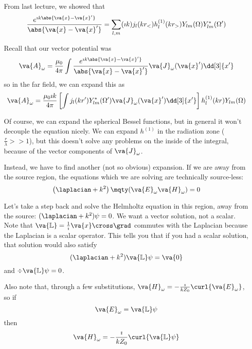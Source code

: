 \documentclass[a4paper,twoside,master.tex]{subfiles}
\begin{document}

From last lecture, we showed that
\begin{equation}
    \frac{e^{\imath k \abs{ \va{x} - \va{x}'}}}{\abs{ \va{x} - \va{x}'}} = \sum_{l,m} (\imath k) j_l(k r_<) h_l^{(1)}(k r_>) Y_{lm}(\Omega) Y_{lm}^*(\Omega')
\end{equation}

Recall that our vector potential was
\begin{equation}
    \va{A}_{\omega} = \frac{\mu_0}{4 \pi} \int \frac{e^{\imath k \abs{ \va{x} - \va{x}'}}}{\abs{ \va{x} - \va{x}'}} \va{J}_{\omega}( \va{x}') \dd[3]{x'}
\end{equation}
so in the far field, we can expand this as
\begin{equation}
    \va{A}_{\omega} = \frac{\mu_0 \imath k}{4 \pi} \left[ \int j_l(kr') Y_{lm}^*(\Omega') \va{J}_{\omega}( \va{x}') \dd[3]{x'} \right] h_l^{(1)}(kr) Y_{lm}(\Omega)
\end{equation}

Of course, we can expand the spherical Bessel functions, but in general it won't decouple the equation nicely. We can expand $ h^{(1)} $ in the radiation zone ($ \frac{r}{\lambda} >> 1 $), but this doesn't solve any problems on the inside of the integral, because of the vector components of $ \va{J}_{\omega} $.

Instead, we have to find another (not so obvious) expansion. If we are away from the source region, the equations which we are solving are technically source-less:
\begin{equation}
    \left( \laplacian + k^2 \right) \mqty( \va{E}_{\omega} \\ \va{H}_{\omega} ) = 0
\end{equation}

Let's take a step back and solve the Helmholtz equation in this region, away from the source: $ (\laplacian + k^2) \psi = 0 $. We want a vector solution, not a scalar. Note that $ \va{\mathbb{L}} = \frac{1}{\imath} \va{x} \cross \grad $ commutes with the Laplacian because the Laplacian is a scalar operator. This tells you that if you had a scalar solution, that solution would also satisfy
\begin{equation}
    (\laplacian + k^2) \va{\mathbb{L}} \psi = \va{0}
\end{equation}
and $ \div{ \va{\mathbb{L}} \psi} = 0 $.

Also note that, through a few substitutions, $ \va{H}_{\omega} = - \frac{\imath}{kZ_0} \curl{ \va{E}_{\omega}} $, so if
\begin{equation}
    \va{E}_{\omega} = \va{\mathbb{L}} \psi
\end{equation}
then
\begin{equation}
    \va{H}_{\omega} = - \frac{\imath}{kZ_0} \curl{ \va{\mathbb{L}} \psi}
\end{equation}
\end{document}
